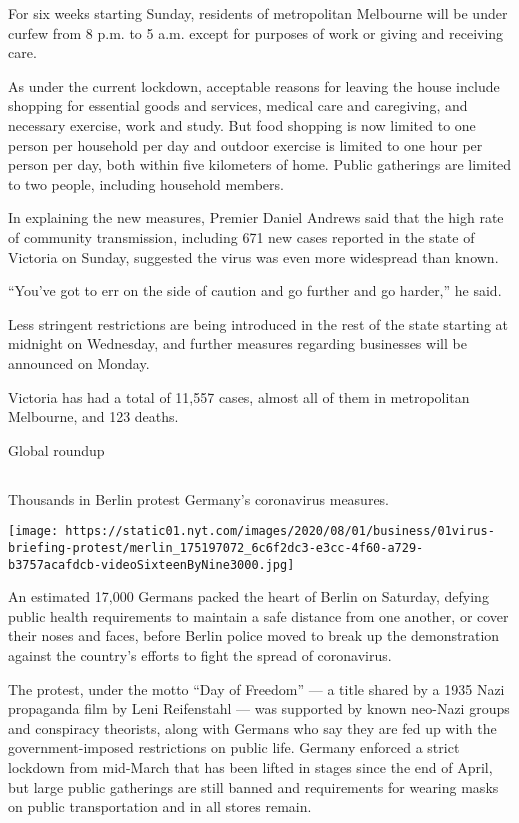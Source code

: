 For six weeks starting Sunday, residents of metropolitan Melbourne will
be under curfew from 8 p.m. to 5 a.m. except for purposes of work or
giving and receiving care.

As under the current lockdown, acceptable reasons for leaving the house
include shopping for essential goods and services, medical care and
caregiving, and necessary exercise, work and study. But food shopping is
now limited to one person per household per day and outdoor exercise is
limited to one hour per person per day, both within five kilometers of
home. Public gatherings are limited to two people, including household
members.

In explaining the new measures, Premier Daniel Andrews said that the
high rate of community transmission, including 671 new cases reported in
the state of Victoria on Sunday, suggested the virus was even more
widespread than known.

``You've got to err on the side of caution and go further and go
harder,'' he said.

Less stringent restrictions are being introduced in the rest of the
state starting at midnight on Wednesday, and further measures regarding
businesses will be announced on Monday.

Victoria has had a total of 11,557 cases, almost all of them in
metropolitan Melbourne, and 123 deaths.

Global roundup

\hypertarget{-3}{%
\subsection{}\label{-3}}

Thousands in Berlin protest Germany's coronavirus measures.

\texttt{[image: https://static01.nyt.com/images/2020/08/01/business/01virus-briefing-protest/merlin\_175197072\_6c6f2dc3-e3cc-4f60-a729-b3757acafdcb-videoSixteenByNine3000.jpg]}

An estimated 17,000 Germans packed the heart of Berlin on Saturday,
defying public health requirements to maintain a safe distance from one
another, or cover their noses and faces, before Berlin police moved to
break up the demonstration against the country's efforts to fight the
spread of coronavirus.

The protest, under the motto ``Day of Freedom'' --- a title shared by a
1935 Nazi propaganda film by Leni Reifenstahl --- was supported by known
neo-Nazi groups and conspiracy theorists, along with Germans who say
they are fed up with the government-imposed restrictions on public life.
Germany enforced a strict lockdown from mid-March that has been lifted
in stages since the end of April, but large public gatherings are still
banned and requirements for wearing masks on public transportation and
in all stores remain.

